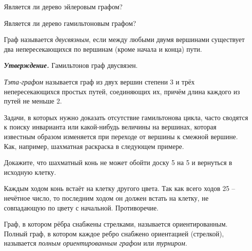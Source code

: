 \newpage

\begin{ques}
    Является ли дерево эйлеровым графом?
\end{ques}

\begin{ques}
    Является ли дерево гамильтоновым графом?
\end{ques}

\begin{dfn}
    Граф называется \textit{двусвязным}, если между любыми двумя вершинами существует два непересекающихся по вершинам (кроме начала и конца) пути.
\end{dfn}

\textit{\textbf{Утверждение.}} Гамильтонов граф двусвязен.

\begin{dfn}
    \textit{Тэта-графом} называется граф из двух вершин степени 3 и трёх непересекающихся простых путей, соединяющих их, причём длина каждого из путей не меньше 2.
\end{dfn}


Задачи, в которых нужно доказать отсутствие гамильтонова цикла, часто сводятся к поиску инварианта или какой-нибудь величины на вершинах, которая известным образом изменяется при переходе от вершины к смежной вершине. Как, например, шахматная раскраска в следующем примере.

\begin{thm}
    Докажите, что шахматный конь не может обойти доску 5 на 5 и вернуться в исходную клетку.
\end{thm}

\begin{prf}
    Каждым ходом конь встаёт на клетку другого цвета. Так как всего ходов 25 -- нечётное число, то последним ходом он должен встать на клетку, не совпадающую по цвету с начальной. Противоречие.
\end{prf}

\begin{dfn}
    Граф, в котором рёбра снабжены стрелками, называется ориентированным. Полный граф, в котором каждое ребро снабжено ориентацией (стрелкой), называется \textit{полным ориентированным графом }или \textit{турниром}.
\end{dfn}

